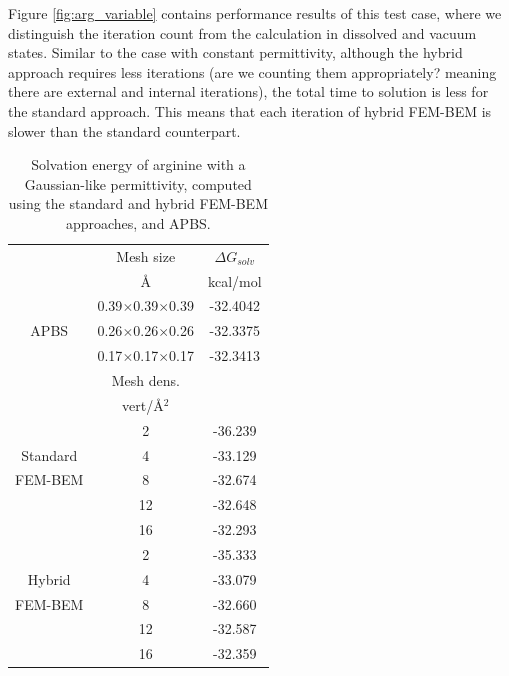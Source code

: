 Figure \ref{fig:arg_variable} contains performance results of this test case, where we distinguish the iteration count from the calculation in dissolved and vacuum states. 
Similar to the case with constant permittivity, although the hybrid approach requires less iterations (are we counting them appropriately? meaning there are external and internal iterations), the total time to solution is less for the standard approach. This means that each iteration of hybrid FEM-BEM is slower than the standard counterpart.


\begin{table}
\centering
\begin{tabular}{c|c|c}
&Mesh size & $\Delta G_{solv}$\\
&\AA       &  kcal/mol \\
\hline
\multirow{3}{*}{APBS}& 0.39$\times$0.39$\times$0.39 & -32.4042\\ 
&0.26$\times$0.26$\times$0.26 & -32.3375\\ 
&0.17$\times$0.17$\times$0.17 & -32.3413\\ 
\hline
&Mesh dens. & \\
&vert/\AA$^2$ & \\
\hline
    & 2 & -36.239\\
Standard    & 4  & -33.129 \\
FEM-BEM    & 8  & -32.674 \\
    & 12 & -32.648 \\
    & 16 & -32.293 \\
\hline
    & 2 & -35.333\\
Hybrid    & 4  & -33.079 \\
FEM-BEM    & 8  & -32.660 \\
    & 12 & -32.587 \\
    & 16 & -32.359 \\
\hline
\end{tabular}
\caption{Solvation energy of arginine with a Gaussian-like permittivity, computed using the standard and hybrid FEM-BEM approaches, and APBS.}
\label{table:arg_variable}
\end{table}

